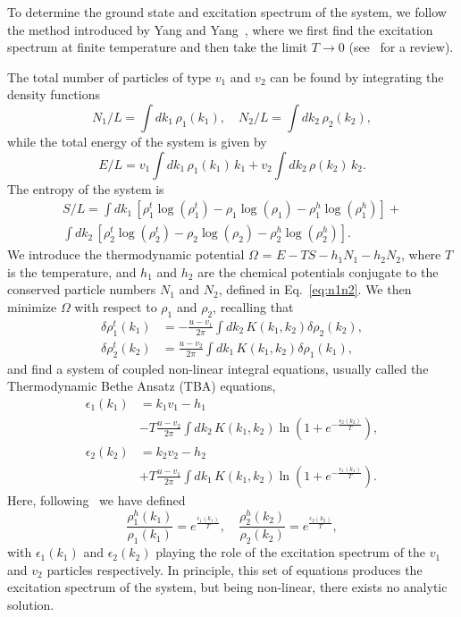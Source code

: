 \documentclass[aps,pra,
superscriptaddress,
reprint,twocolumn,preprintnumbers,
amsmath,amssymb,
nofootinbib]{revtex4-1}
\begin{document}
To determine the ground state and excitation spectrum of the system, we follow the method introduced by Yang and Yang~\cite{Yang1969}, where we first find the excitation spectrum at finite temperature and then take the limit $T\to 0$ (see~\cite{Korepin1993,Takahashi1999} for a review).

The total number of particles of type $v_1$ and $v_2$ can be found by integrating the density functions
        \begin{equation}
        \label{pdensity}
        N_1/L =  \int d k_1\, \rho_1(k_1),\quad N_2/L =  \int d k_2\, \rho_2(k_2),
        \end{equation}
while the total energy of the system is given by
        \begin{equation}
        \label{totenergy}
        E/L  = v_1\int dk_1\,\rho_1(k_1)\,k_1 + v_2\int dk_2\,\rho(k_2)\, k_2.
        \end{equation}
The entropy of the system is
        \begin{multline}
        S/L =  \int dk_1\,\left[\rho_1^t \log(\rho_1^t) - \rho_1\log(\rho_1) - \rho_1^h\log(\rho_1^h) \right] + \\ \int dk_2\,\left[\rho_2^t \log(\rho_2^t) - \rho_2\log(\rho_2) - \rho_2^h\log(\rho_2^h) \right].
        \end{multline}
We introduce the thermodynamic potential $\Omega$ = $E - T S - h_1 N_1 - h_2 N_2$, where $T$ is the temperature, and $h_1$ and $h_2$ are the chemical potentials conjugate to the conserved particle numbers $N_1$ and $N_2$, defined in Eq.~\eqref{eq:n1n2}. We then minimize $\Omega$ with respect to $\rho_1$ and $\rho_2$, recalling that
		\begin{align}
		\delta\rho_1^t(k_1) &=  -\frac{u - v_1}{2\pi}\int dk_2\,K(k_1,k_2) \delta\rho_2(k_2), \nonumber \\
		\delta\rho_2^t(k_2) &=   \frac{u - v_2}{2\pi}\int dk_1\,K(k_1, k_2) \delta\rho_1(k_1),
		\end{align}
and find a system of coupled non-linear integral equations, usually called the Thermodynamic Bethe Ansatz (TBA) equations,
		\begin{align}
		\label{eqn:24}
		\epsilon_1(k_1) & =  k_1 v_1 - h_1 \nonumber \\ 
		& - T \frac{u - v_2}{2\pi}\int d k_2\,K(k_1, k_2) \ln(1 + e^{-\frac{\epsilon_{2}(k_2)}{T}}), \nonumber \\
		\epsilon_2(k_2) & =  k_2 v_2 - h_2 \nonumber \\
		& + T \frac{u - v_1}{2\pi} \int d k_1\,K(k_1, k_2) \ln(1 + e^{-\frac{\epsilon_{1}(k_1)}{T}}).
		\end{align}
Here, following~\cite{Korepin1993} we have defined
		\begin{equation}
		\label{eqn:25}
		\frac{\rho_1^h (k_1)}{\rho_1 (k_1)} = e^{\frac{\epsilon_{1}(k_1)}{T}},\quad \frac{\rho_2^h (k_2)}{\rho_2 (k_2)} = e^{\frac{\epsilon_{2}(k_2)}{T}},
		\end{equation}
with $\epsilon_1 (k_1 )$ and $\epsilon_2(k_2)$ playing the role of the excitation spectrum of the $v_1$ and $v_2$ particles respectively. In principle, this set of equations produces the excitation spectrum of the system, but being non-linear, there exists no analytic solution. 
\end{document}
